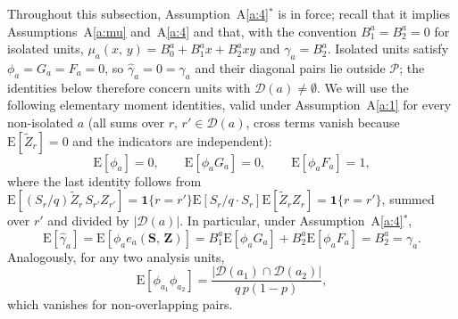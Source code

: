 \documentclass[sigconf]{acmart}
\newcommand{\E}{\mathrm E}
\begin{document}
Throughout this subsection, Assumption~A\ref{a:4}$^*$ is in force; recall that it implies Assumptions~A\ref{a:mu} and~A\ref{a:4} and that, with the convention $B_1^a=B_2^a=0$ for isolated units, $\mu_a(x,\,y) = B_0^a+B_1^ax+B_2^axy$ and $\gamma_a = B_2^a$. Isolated units satisfy $\phi_a=G_a=F_a=0$, so $\hat\gamma_a = 0 = \gamma_a$ and their diagonal pairs lie outside $\mathcal P$; the identities below therefore concern units with $\mathcal D(a)\neq\emptyset$. We will use the following elementary moment identities, valid under Assumption~A\ref{a:1} for every non-isolated $a$ (all sums over $r,\,r'\in\mathcal D(a)$, cross terms vanish because $\E[\tilde Z_r]=0$ and the indicators are independent):
\begin{equation}\label{eq:phi-moments}
    \E[\phi_a] = 0,\qquad \E[\phi_a G_a] = 0,\qquad \E[\phi_a F_a] = 1,
\end{equation}
where the last identity follows from
$\E[(S_r/q)\tilde Z_r\,S_{r'}Z_{r'}] = \mathbf 1\{r=r'\}\E[S_r/q\cdot S_r]\E[\tilde Z_rZ_r] = \mathbf 1\{r=r'\}$, summed over $r'$ and divided by $|\mathcal D(a)|$. In particular, under Assumption~A\ref{a:4}$^*$,
\begin{equation}\label{eq:gamma-unbiased-astar}
    \E[\hat\gamma_a] = \E[\phi_a e_a(\mathbf S,\,\mathbf Z)] = B_1^a\E[\phi_aG_a] + B_2^a\E[\phi_aF_a] = B_2^a = \gamma_a.
\end{equation}
Analogously, for any two analysis units,
\begin{equation}\label{eq:A12}
    \E[\phi_{a_1}\phi_{a_2}] = \frac{|\mathcal D(a_1)\cap\mathcal D(a_2)|}{q\,p(1-p)},
\end{equation}
which vanishes for non-overlapping pairs.
\end{document}
